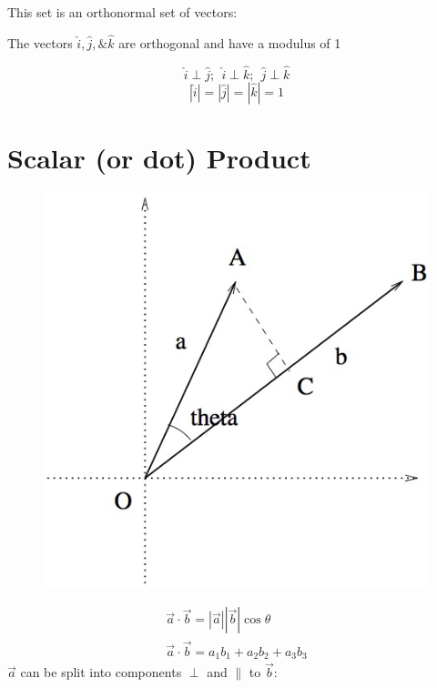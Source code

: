 \documentclass[a4paper, 11pt, normalem]{report}
\begin{document}
This set is an orthonormal set of vectors:

The vectors $\hat{i}, \hat{j}, \& \hat{k}$ are orthogonal and have a modulus of 1

\begin{equation*}
    \hat{i} \perp \hat{j};~~ \hat{i} \perp \hat{k};~~ \hat{j} \perp \hat{k}
\end{equation*}
\begin{equation*}
    |\hat{i}| = |\hat{j}| = |\hat{k}| =  1
\end{equation*}

\section{Scalar (or dot) Product}
\begin{figure}
    \begin{center}
        \includegraphics[scale=0.5]{Scalar.jpg}
    \end{center}
\end{figure}
\begin{gather*}
    \vec{a} \cdot \vec{b} = |\vec{a}||\vec{b}|\cos\theta \\
    \vec{a} \cdot \vec{b} = a_{1}b_{1} + a_{2}b_{2} + a_{3}b_{3}
\end{gather*}
$\vec{a}$ can be split into components $\perp$ and $\parallel$ to $\vec{b}$:
\end{document}

